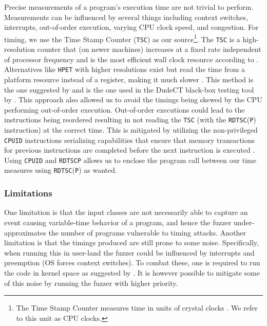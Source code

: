 Precise measurements of a program's execution time are not trivial to perform. 
Measurements can be influenced by several things including context switches, interrupts, out-of-order execution, varying CPU clock speed, and congestion. 
For timing, we use the Time Stamp Counter (\texttt{TSC}) as our source\footnote{The Time Stamp Counter measures time in units of crystal clocks \citep[c]{intel-reference}. We refer to this unit as CPU clocks.}.
The \texttt{TSC} is a high-resolution counter that (on newer machines) increases at a fixed rate independent of processor frequency and is the most efficient wall clock resource according to \citep[b]{intel-reference}.
Alternatives like \texttt{HPET} with higher resolutions exist but read the time from a platform resource instead of a register, making it much slower \citep[b]{intel-reference}.
This method is the one suggested by \citep{intel-benchmark-code-execution} and is the one used in the DudeCT black-box testing tool by \citep{dudect}.
This approach also allowed us to avoid the timings being skewed by the CPU performing out-of-order execution.
Out-of-order executions could lead to the instructions being reordered resulting in not reading the \texttt{TSC} (with the \texttt{RDTSC}(\texttt{P}) instruction) at the correct time. 
This is mitigated by utilizing the non-privileged \texttt{CPUID} instructions serializing capabilities that ensure that memory transactions for previous instructions are completed before the next instruction is executed \citep[a]{intel-reference}.
Using \texttt{CPUID} and \texttt{RDTSCP} allows us to enclose the program call between our time measures using \texttt{RDTSC}(\texttt{P}) as wanted.

\subsubsection{Limitations}
One limitation is that the input classes are not necessarily able to capture an event causing variable-time behavior of a program, and hence the fuzzer under-approximates the number of programs vulnerable to timing attacks.
Another limitation is that the timings produced are still prone to some noise.
Specifically, when running this in user-land the fuzzer could be influenced by interrupts and preemption (OS forces context switches). 
To combat these, one is required to run the code in kernel space as suggested by \citep{intel-benchmark-code-execution}.
It is however possible to mitigate some of this noise by running the fuzzer with higher priority. 
